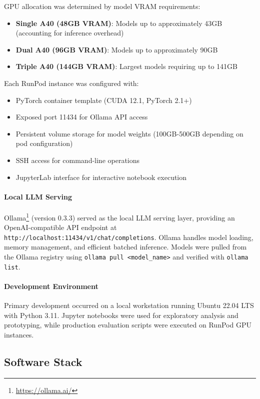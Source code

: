 GPU allocation was determined by model VRAM requirements:
\begin{itemize}
    \item \textbf{Single A40 (48GB VRAM)}: Models up to approximately 43GB (accounting for inference overhead)
    \item \textbf{Dual A40 (96GB VRAM)}: Models up to approximately 90GB
    \item \textbf{Triple A40 (144GB VRAM)}: Largest models requiring up to 141GB
\end{itemize}

Each RunPod instance was configured with:
\begin{itemize}
    \item PyTorch container template (CUDA 12.1, PyTorch 2.1+)
    \item Exposed port 11434 for Ollama API access
    \item Persistent volume storage for model weights (100GB-500GB depending on pod configuration)
    \item SSH access for command-line operations
    \item JupyterLab interface for interactive notebook execution
\end{itemize}

\paragraph{Local LLM Serving} Ollama\footnote{\url{https://ollama.ai/}} (version 0.3.3) served as the local LLM serving layer, providing an OpenAI-compatible API endpoint at \texttt{http://localhost:11434/v1/chat/completions}. Ollama handles model loading, memory management, and efficient batched inference. Models were pulled from the Ollama registry using \texttt{ollama pull <model\_name>} and verified with \texttt{ollama list}.

\paragraph{Development Environment} Primary development occurred on a local workstation running Ubuntu 22.04 LTS with Python 3.11. Jupyter notebooks were used for exploratory analysis and prototyping, while production evaluation scripts were executed on RunPod GPU instances.

\subsection{Software Stack}

